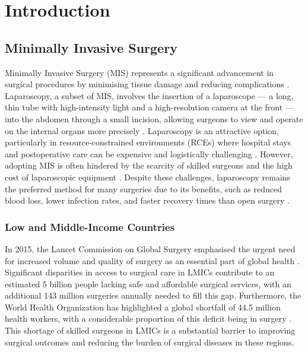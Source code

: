 \section{Introduction}

\subsection{Minimally Invasive Surgery}

Minimally Invasive Surgery (MIS) represents a significant advancement in surgical procedures by minimising tissue damage and reducing complications \cite{jaffray_minimally_2005}. Laparoscopy, a subset of MIS, involves the insertion of a laparoscope — a long, thin tube with high-intensity light and a high-resolution camera at the front — into the abdomen through a small incision, allowing surgeons to view and operate on the internal organs more precisely \cite{monnet_laparoscopy_2003}. Laparoscopy is an attractive option, particularly in resource-constrained environments (RCEs) where hospital stays and postoperative care can be expensive and logistically challenging \cite{rockall_laparoscopy_2014}. However, adopting MIS is often hindered by the scarcity of skilled surgeons and the high cost of laparoscopic equipment \cite{meara_global_2015}. Despite these challenges, laparoscopy remains the preferred method for many surgeries due to its benefits, such as reduced blood loss, lower infection rates, and faster recovery times than open surgery \cite{jaffray_minimally_2005}.

\subsubsection{Low and Middle-Income Countries}

In 2015, the Lancet Commission on Global Surgery emphasised the urgent need for increased volume and quality of surgery as an essential part of global health \cite{meara_global_2015}. Significant disparities in access to surgical care in LMICs contribute to an estimated 5 billion people lacking safe and affordable surgical services, with an additional 143 million surgeries annually needed to fill this gap. Furthermore, the World Health Organization has highlighted a global shortfall of 44.5 million health workers, with a considerable proportion of this deficit being in surgery \cite{world_health_organization_world_2016}. This shortage of skilled surgeons in LMICs is a substantial barrier to improving surgical outcomes and reducing the burden of surgical diseases in these regions. 

